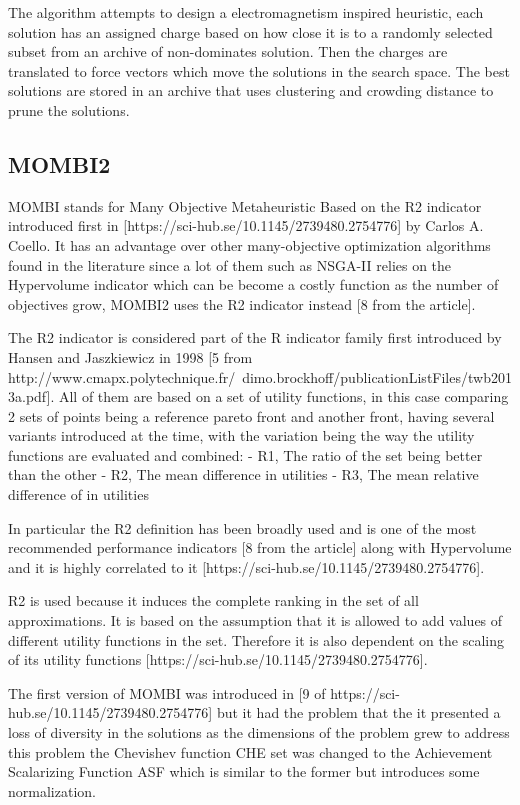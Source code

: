 The algorithm attempts to design a electromagnetism inspired heuristic, each solution has an assigned charge based on how close it is to a randomly selected subset from an archive of non-dominates solution. Then the charges are translated to force vectors which move the solutions in the search space. The best solutions are stored in an archive that uses clustering and crowding distance to prune the solutions.

\subsection{MOMBI2}

MOMBI stands for Many Objective Metaheuristic Based on the R2 indicator introduced first in [https://sci-hub.se/10.1145/2739480.2754776] by Carlos A. Coello. It has an advantage over other  many-objective optimization algorithms found in the literature since a lot of them such as NSGA-II relies on the Hypervolume indicator which can be become a costly function as the number of objectives grow, MOMBI2 uses the R2 indicator instead [8 from the article]. 

The R2 indicator is considered part of the R indicator family first introduced by Hansen and Jaszkiewicz in 1998 [5 from http://www.cmapx.polytechnique.fr/~dimo.brockhoff/publicationListFiles/twb2013a.pdf]. All of them are based on a set of utility functions, in this case comparing 2 sets of points being a reference pareto front and another front,  having several variants introduced at the time, with the variation being the way the utility functions are evaluated and combined:
    - R1, The ratio of the set being better than the other
    - R2, The mean difference in utilities
    - R3, The mean relative difference of in utilities 

In particular the R2 definition has been broadly used and is one of the most recommended performance indicators [8 from the article] along with Hypervolume and it is highly correlated to it [https://sci-hub.se/10.1145/2739480.2754776].

R2 is used because it induces the complete ranking in the set of all approximations. It is based on the assumption that it is allowed to add values of different utility functions in the set. Therefore it is also dependent on the scaling of its utility functions [https://sci-hub.se/10.1145/2739480.2754776].

The first version of MOMBI was introduced in [9 of https://sci-hub.se/10.1145/2739480.2754776] but it had the problem that the it presented a loss of diversity in the solutions as the dimensions of the problem grew to address this problem the Chevishev function CHE set was changed to  the Achievement Scalarizing Function ASF which is similar to the former but introduces some normalization.

